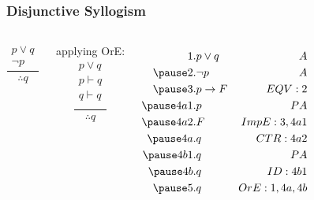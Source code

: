 \documentclass[dvipsnames]{beamer}
\begin{document}
\begin{frame}
  \frametitle{Disjunctive Syllogism}

  \begin{columns}
    \[
    \frac
      {
        \begin{array}{c}
          p \vee q\\
          \neg p
        \end{array}
      }
      {
        \therefore q
      }
    \]

    \pause
    \bigskip
    applying OrE:
    \[
    \frac
      {
        \begin{array}{c}
          p \vee q\\
          p \vdash q\\
          q \vdash q\\
        \end{array}
      }
      {
        \therefore q
      }
    \]

    \pause
    \begin{eqnarray*}
      1.   & p \vee q        & A\\
      \pause
      2.   & \neg p          & A\\
      \pause
      3.   & p \rightarrow F & EQV:2\\
      \pause
      4a1. & p               & PA\\
      \pause
      4a2. & F               & ImpE:3,4a1\\
      \pause
      4a.  & q               & CTR:4a2\\
      \pause
      4b1. & q               & PA\\
      \pause
      4b.  & q               & ID:4b1\\
      \pause
      5.   & q               & OrE:1,4a,4b
    \end{eqnarray*}
  \end{columns}
\end{frame}
\end{document}
